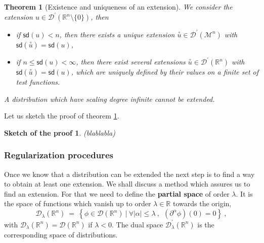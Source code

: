 \documentclass[11pt]{book}
\newcommand{\hilight}[1]{\colorbox{yellow!80!black}{#1}}
\newcommand{\sd}{\mathsf{sd}}
\newcommand{\abs}[1]{\left|#1\right|}
\newcommand{\exte}[1]{\overset{\circ}{#1}}
\newcommand{\Dcal}{\mathcal{D}}
\newcommand{\Mcal}{\mathcal{M}}
\newcommand{\Rbb}{\mathbb{R}}
\theoremstyle{break}
\newtheorem{theorem}{Theorem}[chapter]
\newtheorem{sketch}{Sketch of the proof}[chapter]
\begin{document}
\begin{theorem}[Existence and uniqueness of an extension]\label{theo:extension_distribution_numeric}
We consider the extension $u \in \Dcal^\prime(\Rbb^n \setminus \{0\})$, then
%
\vspace*{-5pt}
\begin{itemize}
\setlength\itemsep{0pt}
\item if $\sd(u) < n$, then there exists a unique extension $\exte{u} \in \Dcal^\prime(\Mcal^n)$ with $\sd(\exte{u})=\sd(u)$,
%
\item if $n \leq \sd(u) < \infty$, then there exist several extensions $\exte{u} \in \Dcal^\prime(\Rbb^n)$ with $\sd(\exte{u})=\sd(u)$, which are uniquely defined by their values on a finite set of test functions.
\end{itemize}
%
A distribution which have scaling degree infinite cannot be extended.
\end{theorem}


Let us sketch the proof of theorem \ref{theo:extension_distribution_numeric}.


\begin{sketch}
\hilight{(blablabla)}
\end{sketch}


\subsubsection{Regularization procedures}


Once we know that a distribution can be extended the next step is to find a way to obtain at least one extension. We shall discuss a method which assures us to find an extension.  For that we need to define the \textbf{partial space} of order $\lambda$. It is the space of functions which vanish up to order $\lambda \in \Rbb$ towards the origin, 
%
\begin{equation*}
\Dcal_{\lambda}(\Rbb^n) \ = \ \left\{ \phi \in \Dcal(\Rbb^n) \ | \ \forall \abs{\alpha} \leq \lambda \ , \ \ \left(\partial^{\alpha}\phi\right)(0)=0 \right\} \ ,
\end{equation*}
%
with $\Dcal_\lambda(\Rbb^n) = \Dcal(\Rbb^n)$ if $\lambda < 0$. The dual space $\Dcal^\prime_\lambda(\Rbb^n)$ is the corresponding space of distributions. 
\end{document}
